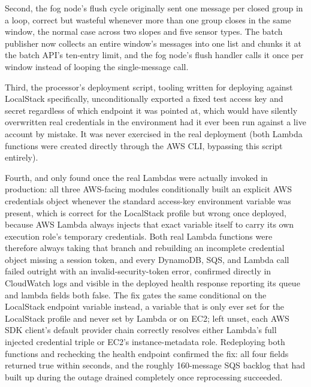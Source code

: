 \documentclass[conference]{IEEEtran}
\begin{document}
Second, the fog node's flush cycle originally sent one message per closed group in a loop, correct but wasteful whenever more than one group closes in the same window, the normal case across two slopes and five sensor types. The batch publisher now collects an entire window's messages into one list and chunks it at the batch API's ten-entry limit, and the fog node's flush handler calls it once per window instead of looping the single-message call.

Third, the processor's deployment script, tooling written for deploying against LocalStack specifically, unconditionally exported a fixed test access key and secret regardless of which endpoint it was pointed at, which would have silently overwritten real credentials in the environment had it ever been run against a live account by mistake. It was never exercised in the real deployment (both Lambda functions were created directly through the AWS CLI, bypassing this script entirely).

Fourth, and only found once the real Lambdas were actually invoked in production: all three AWS-facing modules conditionally built an explicit AWS credentials object whenever the standard access-key environment variable was present, which is correct for the LocalStack profile but wrong once deployed, because AWS Lambda always injects that exact variable itself to carry its own execution role's temporary credentials. Both real Lambda functions were therefore always taking that branch and rebuilding an incomplete credential object missing a session token, and every DynamoDB, SQS, and Lambda call failed outright with an invalid-security-token error, confirmed directly in CloudWatch logs and visible in the deployed health response reporting its queue and lambda fields both false. The fix gates the same conditional on the LocalStack endpoint variable instead, a variable that is only ever set for the LocalStack profile and never set by Lambda or on EC2; left unset, each AWS SDK client's default provider chain correctly resolves either Lambda's full injected credential triple or EC2's instance-metadata role. Redeploying both functions and rechecking the health endpoint confirmed the fix: all four fields returned true within seconds, and the roughly 160-message SQS backlog that had built up during the outage drained completely once reprocessing succeeded.
\end{document}

